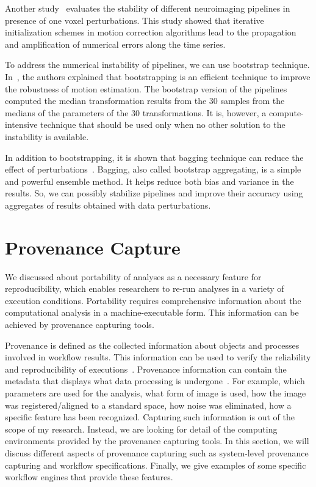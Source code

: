 Another study~\cite{Glatard2018hbm} evaluates the stability of different 
neuroimaging pipelines in presence of one voxel perturbations. This 
study showed that iterative initialization schemes in motion correction 
algorithms lead to the propagation and amplification of numerical 
errors along the time series. 

To address the numerical instability of pipelines, we can use bootstrap 
technique. In~\cite{Glatard2018hbm}, the authors explained that bootstrapping 
is an efficient technique to improve the robustness of motion 
estimation. The bootstrap version of the pipelines computed the median 
transformation results from the 30 samples from the medians of the 
parameters of the 30 transformations. It is, however, a 
compute-intensive technique that should be used only when no other 
solution to the instability is available. 

In addition to bootstrapping, it is shown that bagging technique can 
reduce the effect of perturbations~\cite{breiman1996bagging, 
breiman1996heuristics}. Bagging, also called bootstrap aggregating, is 
a simple and powerful ensemble method. It helps reduce both bias and 
variance in the results. So, we can possibly stabilize pipelines and improve 
their accuracy using aggregates of results obtained with data 
perturbations. 


\section{Provenance Capture}

We discussed about portability of analyses as a necessary feature for 
reproducibility, which enables researchers to re-run analyses in a 
variety of execution conditions. Portability requires comprehensive 
information about the computational analysis in a machine-executable 
form. This information can be achieved by provenance capturing 
tools. 

Provenance is defined as the collected information about objects and 
processes involved in workflow results. This information can be 
used to verify the reliability and reproducibility of 
executions~\cite{missier2013w3c}. Provenance information can contain the 
metadata that displays what data processing is 
undergone~\cite{nichols2017best}. For example, which parameters are 
used for the analysis, what form of image is used, how the image was 
registered/aligned to a standard space, how noise was eliminated, how 
a specific feature has been recognized. Capturing such information is 
out of the scope of my research. Instead, we are looking for 
detail of the computing environments provided by the provenance 
capturing tools. In this section, we will discuss different aspects 
of provenance capturing such as system-level provenance capturing and 
workflow specifications. Finally, we give examples of some specific 
workflow engines that provide these features. 

